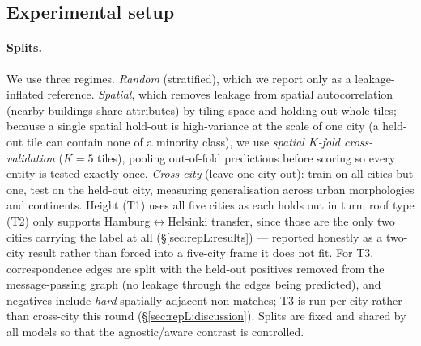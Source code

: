 \subsection{Experimental setup}
\label{sec:repL:setup}
\paragraph{Splits.} We use three regimes. \emph{Random} (stratified), which we
report only as a leakage-inflated reference. \emph{Spatial}, which removes
leakage from spatial autocorrelation (nearby buildings share attributes) by
tiling space and holding out whole tiles; because a single spatial hold-out is
high-variance at the scale of one city (a held-out tile can contain none of a
minority class), we use \emph{spatial $K$-fold cross-validation} ($K{=}5$
tiles), pooling out-of-fold predictions before scoring so every entity is tested
exactly once. \emph{Cross-city} (leave-one-city-out): train on all cities but
one, test on the held-out city, measuring generalisation across urban
morphologies and continents. Height (T1) uses all five cities as each holds
out in turn; roof type (T2) only supports Hamburg$\leftrightarrow$Helsinki
transfer, since those are the only two cities carrying the label at all
(\S\ref{sec:repL:results}) --- reported honestly as a two-city result rather
than forced into a five-city frame it does not fit. For T3, correspondence
edges are split with the held-out positives removed from the message-passing
graph (no leakage through the edges being predicted), and negatives include
\emph{hard} spatially adjacent non-matches; T3 is run per city rather than
cross-city this round (\S\ref{sec:repL:discussion}). Splits are fixed and
shared by all models so that the agnostic/aware contrast is controlled.

